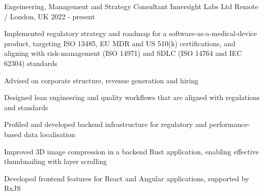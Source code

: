 

\begin{cventries}

  \cventry
    {Engeineering, Management and Strategy Consultant} %
    {Innersight Labs Ltd} %
    {Remote / London, UK} %
    {2022 - present} %
    {
      \begin{cvitems} %
        \item {Implemented regulatory strategy and roadmap for a software-as-a-medical-device product, targeting ISO 13485, EU MDR and US 510(k) certifications, and aligning with risk-management (ISO 14971) and SDLC (ISO 14764 and IEC 62304) standards}
        \item {Advised on corporate structure, revenue generation and hiring}
        \item {Designed lean engineering and quality workflows that are aligned with regulations and standards}
        \item {Profiled and developed backend infrastructure for regulatory and performance-based data localisation}
        \item {Improved 3D image compression in a backend Rust application, enabling effective thumbnailing with layer scrolling}
        \item {Developed frontend features for React and Angular applications, supported by RxJS}
      \end{cvitems}
    }


\end{cventries}
